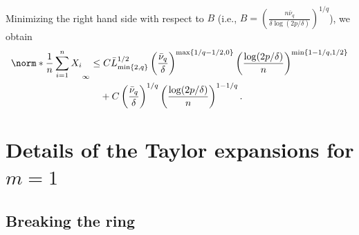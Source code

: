 \documentclass[aos]{imsart}
\begin{document}
\begin{appendix}
\begin{equation*}
\begin{aligned}
\end{aligned}
\end{equation*}
Minimizing the right hand side with respect to $B$ (i.e., $B = (\frac{n \bar{\nu}_q}{\delta \log(2p/\delta)})^{1/q}$), we obtain
\begin{equation*}
\begin{aligned}
    \norm*{\frac{1}{n}\sum_{i=1}^n X_i}_\infty
    & \leq C \bar{L}_{\min\{2, q\}}^{1/2} \left(\frac{\bar{\nu}_q}{\delta} \right)^{\max\{1/q-1/2,0\}}
    \left(\frac{\log(2p/\delta)}{n}\right)^{\min\{1-1/q, 1/2\}} \\
    & \quad + C \left(\frac{\bar{\nu}_q}{\delta} \right)^{1/q} \left(\frac{\log(2p/\delta)}{n}\right)^{1-1/q}.
\end{aligned}
\end{equation*}

\section{Details of the Taylor expansions for \texorpdfstring{$m=1$}{m=1}}
\label{sec:Taylor_expansion}

\subsection{Breaking the ring} \label{sec:breaking_ring}


\end{appendix}
\end{document}
